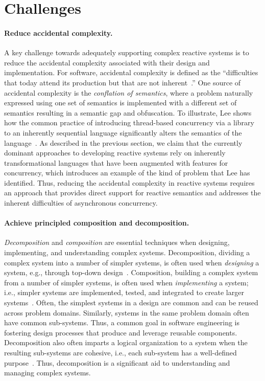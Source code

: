 \section{Challenges}
\label{challenges}

\paragraph{Reduce accidental complexity.}
A key challenge towards adequately supporting complex reactive systems is to reduce the accidental complexity associated with their design and implementation.
For software, accidental complexity is defined as the ``difficulties that today attend its production but that are not inherent~\cite{brooks1995mythical}.''
One source of accidental complexity is the \emph{conflation of semantics}, where a problem naturally expressed using one set of semantics is implemented with a different set of semantics resulting in a semantic gap and obfuscation.
To illustrate, Lee shows how the common practice of introducing thread-based concurrency via a library to an inherently sequential language significantly alters the semantics of the language~\cite{lee2006problem}.
As described in the previous section, we claim that the currently dominant approaches to developing reactive systems rely on inherently transformational languages that have been augmented with features for concurrency, which introduces an example of the kind of problem that Lee has identified.
Thus, reducing the accidental complexity in reactive systems requires an approach that provides direct support for reactive semantics and addresses the inherent difficulties of asynchronous concurrency.

\paragraph{Achieve principled composition and decomposition.}
\emph{Decomposition} and \emph{composition} are essential techniques when designing, implementing, and understanding complex systems.
Decomposition, dividing a complex system into a number of simpler systems, is often used when \emph{designing} a system, e.g., through top-down design~\cite{wirth1971program}.
Composition, building a complex system from a number of simpler systems, is often used when \emph{implementing} a system; i.e., simpler systems are implemented, tested, and integrated to create larger systems~\cite{brooks1995mythical}.
Often, the simplest systems in a design are common and can be reused across problem domains.
Similarly, systems in the same problem domain often have common sub-systems.
Thus, a common goal in software engineering is fostering design processes that produce and leverage reusable components.
Decomposition also often imparts a logical organization to a system when the resulting sub-systems are cohesive, i.e., each sub-system has a well-defined purpose~\cite{parnas1972criteria}.
Thus, decomposition is a significant aid to understanding and managing complex systems.

